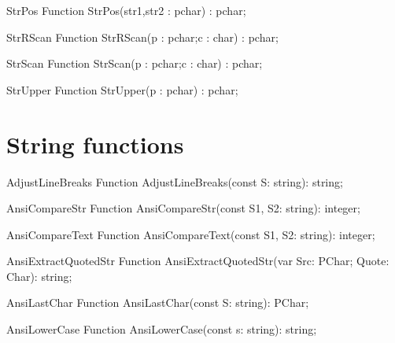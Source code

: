  
\begin{function}{StrPos}
\Declaration
Function StrPos(str1,str2 : pchar) : pchar;
\Description
\Errors
\SeeAlso
\end{function}

 
\begin{function}{StrRScan}
\Declaration
Function StrRScan(p : pchar;c : char) : pchar;
\Description
\Errors
\SeeAlso
\end{function}

 
\begin{function}{StrScan}
\Declaration
Function StrScan(p : pchar;c : char) : pchar;
\Description
\Errors
\SeeAlso
\end{function}

 
\begin{function}{StrUpper}
\Declaration
Function StrUpper(p : pchar) : pchar;
\Description
\Errors
\SeeAlso
\end{function}

\section{String functions}

\begin{function}{AdjustLineBreaks}
\Declaration
Function AdjustLineBreaks(const S: string): string;
\Description
\Errors
\SeeAlso
\end{function}

 
\begin{function}{AnsiCompareStr}
\Declaration
Function AnsiCompareStr(const S1, S2: string): integer;
\Description
\Errors
\SeeAlso
\end{function}

 
\begin{function}{AnsiCompareText}
\Declaration
Function AnsiCompareText(const S1, S2: string): integer;
\Description
\Errors
\SeeAlso
\end{function}

 
\begin{function}{AnsiExtractQuotedStr}
\Declaration
Function AnsiExtractQuotedStr(var Src: PChar; Quote: Char): string;
\Description
\Errors
\SeeAlso
\end{function}

 
\begin{function}{AnsiLastChar}
\Declaration
Function AnsiLastChar(const S: string): PChar;
\Description
\Errors
\SeeAlso
\end{function}

 
\begin{function}{AnsiLowerCase}
\Declaration
Function AnsiLowerCase(const s: string): string;
\Description
\Errors
\SeeAlso
\end{function}

